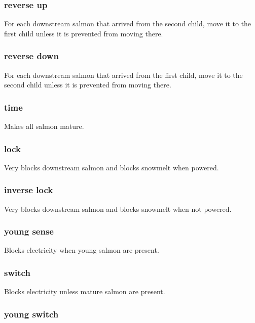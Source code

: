 \documentclass[10pt]{article}
\begin{document}
\subsubsection{reverse up}

For each downstream salmon that arrived from the second child, move it to the first child unless it is prevented from moving
there.

\subsubsection{reverse down}

For each downstream salmon that arrived from the first child, move it to the second child unless it is prevented from moving
there.

\subsubsection{time}

Makes all salmon mature.

\subsubsection{lock}

Very blocks downstream salmon and blocks snowmelt when powered.

\subsubsection{inverse lock}

Very blocks downstream salmon and blocks snowmelt when not powered.

\subsubsection{young sense}

Blocks electricity when young salmon are present.

\subsubsection{switch}

Blocks electricity unless mature salmon are present.

\subsubsection{young switch}
\end{document}
